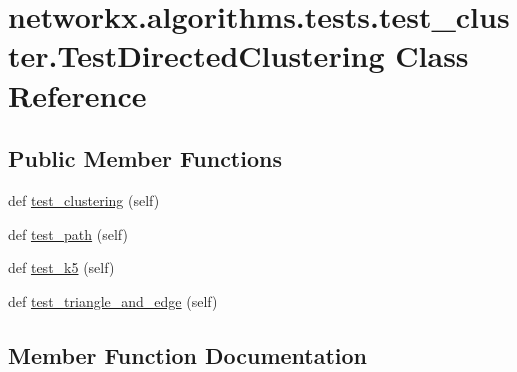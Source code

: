 \hypertarget{classnetworkx_1_1algorithms_1_1tests_1_1test__cluster_1_1TestDirectedClustering}{}\section{networkx.\+algorithms.\+tests.\+test\+\_\+cluster.\+Test\+Directed\+Clustering Class Reference}
\label{classnetworkx_1_1algorithms_1_1tests_1_1test__cluster_1_1TestDirectedClustering}
\subsection*{Public Member Functions}
\begin{DoxyCompactItemize}
\item 
def \hyperlink{classnetworkx_1_1algorithms_1_1tests_1_1test__cluster_1_1TestDirectedClustering_a1eb2a826076835f2b2dad7f173668b9e}{test\+\_\+clustering} (self)
\item 
def \hyperlink{classnetworkx_1_1algorithms_1_1tests_1_1test__cluster_1_1TestDirectedClustering_a6e514e2dbe00e8083296f656466d588e}{test\+\_\+path} (self)
\item 
def \hyperlink{classnetworkx_1_1algorithms_1_1tests_1_1test__cluster_1_1TestDirectedClustering_a1844beace752692b102bc3fa68694309}{test\+\_\+k5} (self)
\item 
def \hyperlink{classnetworkx_1_1algorithms_1_1tests_1_1test__cluster_1_1TestDirectedClustering_a59325f3692d778b5f4fccf010fc27d41}{test\+\_\+triangle\+\_\+and\+\_\+edge} (self)
\end{DoxyCompactItemize}


\subsection{Member Function Documentation}
\mbox{\label{classnetworkx_1_1algorithms_1_1tests_1_1test__cluster_1_1TestDirectedClustering_a1eb2a826076835f2b2dad7f173668b9e}} 
